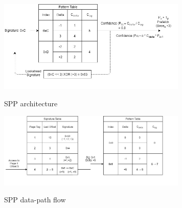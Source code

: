 \begin{figure}
  \begin{center}
  \includegraphics[width=9cm]{figures/SPP_Prefetch_Description.jpg}
    \label{fig:spp_strcture}
  \caption{SPP architecture}
  \end{center}
\end{figure}

\begin{figure}
  \begin{center}
  \includegraphics[width=9cm]{figures/SPP_Update_Description.jpg}
  \label{fig:spp_update}
  \caption{SPP data-path flow}
  \end{center}
\end{figure}





